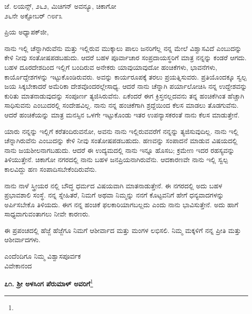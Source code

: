 \begin{flushright}
 ಜೆ. ಲಯನ್ಸ್, ೨೬೨, ಮಿಚಿಗನ್ ಅವನ್ಯೂ, ಚಿಕಾಗೋ\\೨೬ನೇ ಅಕ್ಟೋಬರ್ ೧೮೯೩
\end{flushright}

\noindent
ಪ್ರಿಯ ಅಧ್ಯಾಪಕ್‌ಜೀ,

ನಾನು ಇಲ್ಲಿ ಚೆನ್ನಾಗಿರುವೆನು ಮತ್ತು ಇಲ್ಲಿರುವ ಮುಕ್ಕಾಲು ಪಾಲು ಜನರಿಗೆಲ್ಲ ನನ್ನ ಮೇಲೆ ವಿಶ್ವಾಸವಿದೆ ಎಂಬುದನ್ನು ಕೇಳಿ ನೀವು ಸಂತೋಷಪಡಬಹುದು. ಆದರೆ ಬಹಳ ಪೂರ್ವಾಚಾರ ಸಂಪ್ರದಾಯಸ್ಥರಿಗೆ ಮಾತ್ರ ನನ್ನನ್ನು ಕಂಡರೆ ಆಗದು. ಬಹಳ ದೂರದೇಶದಿಂದ ಇಲ್ಲಿಗೆ ಬಂದಿರುವ ಅನೇಕರು ಯಾವುಯಾವುದೋ ಹಂಚಿಕೆಗಳು, ಭಾವನೆಗಳು, ಕಾರ್ಯೊದ್ದೇಶಗಳನ್ನು ಇಟ್ಟುಕೊಂಡಿರುವರು. ಅವನ್ನು ಕಾರ್ಯರೂಪಕ್ಕೆ ತರಲು ಪ್ರಯತ್ನಿಸುವರು. ಪ್ರತಿಯೊಂದಕ್ಕೂ ಸ್ವಲ್ಪ ಜಯ ಸಿಕ್ಕಬೇಕಾದರೆ ಅಮೆರಿಕಾ ದೇಶವೊಂದರಲ್ಲೇಸಾಧ್ಯ. ಆದರೆ ನಾನು ಚೆನ್ನಾಗಿ ಪರ್ಯಾಲೋಚಿಸಿ ನನ್ನ ಉದ್ದೇಶವನ್ನು ಕುರಿತು ಮಾತನಾಡುವುದನ್ನು ಸಂಪೂರ್ಣ ತ್ಯಜಿಸಿರುವೆನು. ಏಕೆಂದರೆ ಈಗ ಕ್ರಿಸ್ತನಲ್ಲದವನು ತನ್ನ ಹಂಚಿಕೆಗಿಂತ ಹೆಚ್ಚಾಗಿ ಸಾಧಿಸುವನು ಎಂಬುದರಲ್ಲಿ ಸಂದೇಹವಿಲ್ಲ. ನಾನು ನನ್ನ ಹಂಚಿಕೆಗಾಗಿ ಶ್ರದ್ದೆಯಿಂದ ಕೆಲಸ ಮಾಡಲು ತೊಡಗುವೆನು. ಆದರೆ ಹಂಚಿಕೆಯನ್ನು ಮಾತ್ರ ಮನಸ್ಸಿನ ಒಳಗೇ ಇಟ್ಟುಕೊಂಡು ಇತರ ಉಪನ್ಯಾಸಕರಂತೆ ನಾನು ಕೆಲಸ ಮಾಡುತ್ತೇನೆ.

ಯಾರು ನನ್ನನ್ನು ಇಲ್ಲಿಗೆ ಕರೆತಂದಿರುವನೋ, ಅವನು ನಾನು ಇಲ್ಲಿರುವವರೆಗೆ ನನ್ನನ್ನು ತ್ಯಜಿಸುವುದಿಲ್ಲ. ನಾನು ಇಲ್ಲಿ ಚೆನ್ನಾಗಿರುವೆನು ಎಂಬುದನ್ನು ಕೇಳಿ ನೀವು ಸಂತೋಷಪಡಬಹುದು. ಹಣವನ್ನು ಸಂಪಾದನೆ ಮಾಡುವ ವಿಷಯದಲ್ಲಿ ನಾನು ಜಯಶೀಲನಾಗಬಹುದು. ಆದರೆ ಈ ಉದ್ಯಮದಲ್ಲಿ ನಾನು ಇನ್ನೂ ಹೊಸಬ; ಕ್ರಮೇಣ ಇದರ ರಹಸ್ಯವನ್ನು ತಿಳಿಯುತ್ತೇನೆ. ಚಿಕಾಗೋ ನಗರದಲ್ಲಿ ನಾನು ಬಹಳ ಜನಪ್ರಿಯನಾಗಿರುವೆನು. ಆದಕಾರಣವೇ ನಾನು ಇಲ್ಲಿ ಸ್ವಲ್ಪ ಕಾಲವಿದ್ದು ಹಣ ಸಂಪಾದಿಸಬೇಕೆಂದಿರುವೆನು.

ನಾನು ನಾಳೆ ಸ್ತ್ರೀಯರ ನಲ್ಲಿ ಬೌದ್ಧ ಧರ್ಮದ ವಿಷಯವಾಗಿ ಮಾತನಾಡುತ್ತೇನೆ. ಈ ನಗರದಲ್ಲಿ ಅದು ಬಹಳ ಪ್ರಭಾವಶಾಲಿ ಸಂಸ್ಥೆ. ನನ್ನ ಸ್ನೇಹಿತರೆ, ನಿಮಗೆ ಅಥವಾ ನಿಮ್ಮನ್ನು ನನಗೆ ಕೊಟ್ಟವನಿಗೆ ಹೇಗೆ ಧನ್ಯವಾದಗಳನ್ನು ಅರ್ಪಿಸಬೇಕೊ ತಿಳಿಯದು. ಈಗ ನನ್ನ ಹಂಚಿಕೆ ಫಲಕಾರಿಯಾಗಬಲ್ಲದು ಎಂದು ನಾನು ಭಾವಿಸುತ್ತೇನೆ. ಅದು ಹಾಗೆ ಸಾಧ್ಯವಾಗುವಂತಾಗಲು ನೀವೇ ಕಾರಣರು.

ಈ ಪ್ರಪಂಚದಲ್ಲಿ ಹೆಜ್ಜೆ ಹೆಜ್ಜೆಗೂ ನಿಮಗೆ ಆಶೀರ್ವಾದ ಮತ್ತು ಮಂಗಳ ಲಭಿಸಲಿ. ನಿಮ್ಮ ಮಕ್ಕಳಿಗೆ ನನ್ನ ಪ್ರೀತಿ ಮತ್ತು ಆಶೀರ್ವಾದಗಳು.

\vspace{-0.3cm}

{\flushright
ಎಂದೆಂದಿಗೂ ನಿಮ್ಮ ವಿಶ್ವಾಸಪೂರ್ವಕ\\ವಿವೇಕಾನಂದ\par}


\begin{center}
\textbf{೭೧. ಶ‍್ರೀ ಅಳಸಿಂಗ ಪೆರುಮಾಳ್ ಅವರಿಗೆ}\footnote{}
\end{center}

\vspace{-0.5cm}

